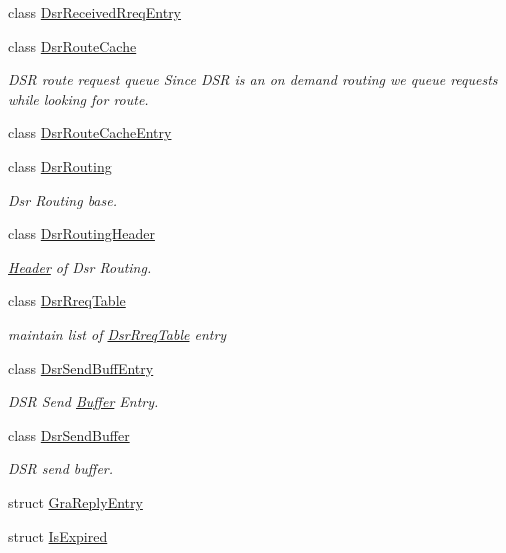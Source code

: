 \begin{DoxyCompactItemize}
class \hyperlink{classns3_1_1dsr_1_1DsrReceivedRreqEntry}{Dsr\+Received\+Rreq\+Entry}
\item 
class \hyperlink{classns3_1_1dsr_1_1DsrRouteCache}{Dsr\+Route\+Cache}
\begin{DoxyCompactList}\small\item\em D\+SR route request queue Since D\+SR is an on demand routing we queue requests while looking for route. \end{DoxyCompactList}\item 
class \hyperlink{classns3_1_1dsr_1_1DsrRouteCacheEntry}{Dsr\+Route\+Cache\+Entry}
\item 
class \hyperlink{classns3_1_1dsr_1_1DsrRouting}{Dsr\+Routing}
\begin{DoxyCompactList}\small\item\em Dsr Routing base. \end{DoxyCompactList}\item 
class \hyperlink{classns3_1_1dsr_1_1DsrRoutingHeader}{Dsr\+Routing\+Header}
\begin{DoxyCompactList}\small\item\em \hyperlink{classns3_1_1Header}{Header} of Dsr Routing. \end{DoxyCompactList}\item 
class \hyperlink{classns3_1_1dsr_1_1DsrRreqTable}{Dsr\+Rreq\+Table}
\begin{DoxyCompactList}\small\item\em maintain list of \hyperlink{classns3_1_1dsr_1_1DsrRreqTable}{Dsr\+Rreq\+Table} entry \end{DoxyCompactList}\item 
class \hyperlink{classns3_1_1dsr_1_1DsrSendBuffEntry}{Dsr\+Send\+Buff\+Entry}
\begin{DoxyCompactList}\small\item\em D\+SR Send \hyperlink{classns3_1_1Buffer}{Buffer} Entry. \end{DoxyCompactList}\item 
class \hyperlink{classns3_1_1dsr_1_1DsrSendBuffer}{Dsr\+Send\+Buffer}
\begin{DoxyCompactList}\small\item\em D\+SR send buffer. \end{DoxyCompactList}\item 
struct \hyperlink{structns3_1_1dsr_1_1GraReplyEntry}{Gra\+Reply\+Entry}
\item 
struct \hyperlink{structns3_1_1dsr_1_1IsExpired}{Is\+Expired}
\item 

\end{DoxyCompactItemize}
